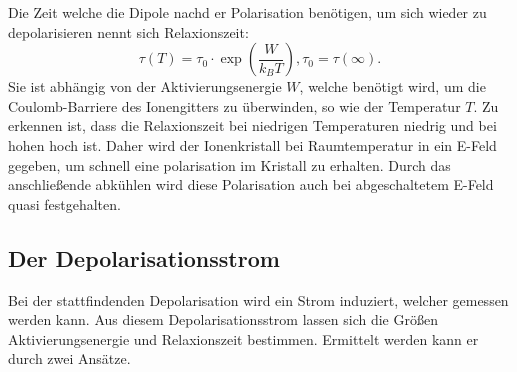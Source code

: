 Die Zeit welche die Dipole nachd er Polarisation benötigen,
um sich wieder zu depolarisieren nennt sich Relaxionszeit:
\begin{equation}
    \tau(T) = \tau_0 \cdot \exp\left(\frac{W}{k_B T}\right) , \tau_0 =\tau(\infty).
\end{equation}
Sie ist abhängig von der Aktivierungsenergie $W$,
welche benötigt wird,
um die Coulomb-Barriere des Ionengitters zu überwinden,
so wie der Temperatur $T$.
Zu erkennen ist,
dass die Relaxionszeit bei niedrigen Temperaturen niedrig und bei hohen hoch ist.
Daher wird der Ionenkristall bei Raumtemperatur in ein E-Feld gegeben,
um schnell eine polarisation im Kristall zu erhalten.
Durch das anschließende abkühlen wird diese Polarisation auch bei abgeschaltetem E-Feld quasi festgehalten. 



\subsection{Der Depolarisationsstrom}
Bei der stattfindenden Depolarisation wird ein Strom induziert,
welcher gemessen werden kann. 
Aus diesem Depolarisationsstrom lassen sich die Größen Aktivierungsenergie und Relaxionszeit bestimmen.
Ermittelt werden kann er durch zwei Ansätze.

